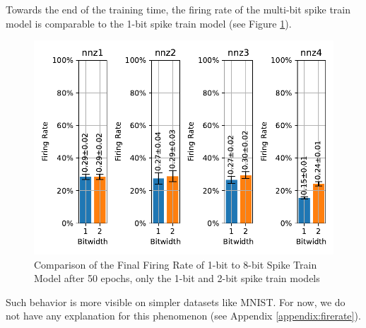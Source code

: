     Towards the end of the training time, the firing rate of the multi-bit spike train model is comparable to the 1-bit spike train model (see Figure \ref{fig:final_firing_rate}).
    \begin{figure}[!htpb]
        \centering
        \includegraphics[width=\textwidth]{../firerate/FashionMNIST/plots/fashionmnist_final_firerate.pdf}
        \caption{Comparison of the Final Firing Rate of 1-bit to 8-bit Spike Train Model after 50 epochs, only the 1-bit and 2-bit spike train models}
        \label{fig:final_firing_rate}
    \end{figure}

    Such behavior is more visible on simpler datasets like MNIST. For now, we do not have any explanation for this phenomenon (see Appendix \ref{appendix:firerate}).


